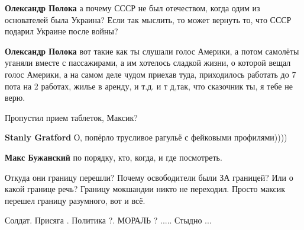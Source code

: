 \begin{itemize}
\begin{itemize}
\begin{itemize}
\textbf{Олександр Полока} а почему СССР не был отечеством, когда одим из
основателей была Украина? Если так мыслить, то может вернуть то, что СССР
подарил Украине после войны?

\textbf{Олександр Полока} вот такие как ты слушали голос Америки, а потом
самолёты уганяли вместе с пассажирами, а им хотелось сладкой жизни, о которой
вещал голос Америки, а на самом деле чудом приехав туда, приходилось работать
до 7 пота на 2 работах, жилье в аренду, и т.д. и т д,так, что сказочник ты, я
тебе не верю.



Пропустил прием таблеток, Максик?


\textbf{Stanly Gratford} О, попёрло трусливое рагульё с фейковыми профилями))))

\end{itemize}

\textbf{Макс Бужанский} по порядку, кто, когда, и где посмотреть.


Откуда они границу перешли? Почему освободители были ЗА границей? Или о какой
границе речь? Границу мокшандии никто не переходил. Просто максик перешел
границу разумного, вот и всё.

Солдат. Присяга . Политика ?. МОРАЛЬ ? ..... Стыдно ...

\end{itemize}

\end{itemize}
